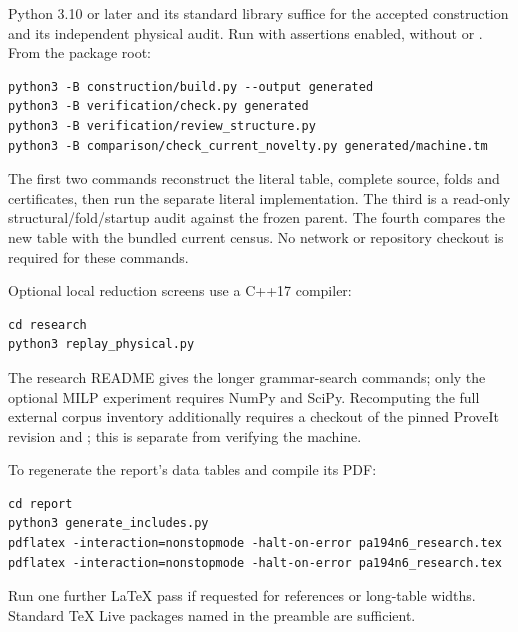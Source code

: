 Python 3.10 or later and its standard library
suffice for the accepted construction and its independent physical audit.
Run with assertions enabled, without  or .
From the package root:
\begin{verbatim}
python3 -B construction/build.py --output generated
python3 -B verification/check.py generated
python3 -B verification/review_structure.py
python3 -B comparison/check_current_novelty.py generated/machine.tm
\end{verbatim}
The first two commands reconstruct the literal table, complete source,
folds and certificates, then run the separate literal implementation.
The third is a read-only structural/fold/startup audit against the frozen
parent. The fourth compares the new table with the bundled current census.
No network or repository checkout is required for these commands.

Optional local reduction screens use a C++17 compiler:
\begin{verbatim}
cd research
python3 replay_physical.py
\end{verbatim}
The research README gives the longer grammar-search commands; only the
optional MILP experiment requires NumPy and SciPy. Recomputing the full
external corpus inventory additionally requires a checkout of the pinned
ProveIt revision and ; this is separate from verifying the machine.

To regenerate the report's data tables and compile its PDF:
\begin{verbatim}
cd report
python3 generate_includes.py
pdflatex -interaction=nonstopmode -halt-on-error pa194n6_research.tex
pdflatex -interaction=nonstopmode -halt-on-error pa194n6_research.tex
\end{verbatim}
Run one further LaTeX pass if requested for references or long-table widths.
Standard TeX Live packages named in the preamble are sufficient.
